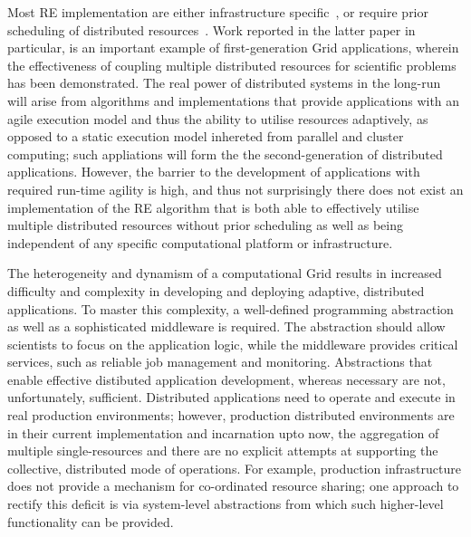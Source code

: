 \documentclass{rspublic}
\begin{document}
Most RE implementation are either infrastructure
specific~\cite{catchup}, or require prior scheduling of distributed
resources~\cite{owain}. Work reported in the latter paper in
particular, is an important example of first-generation Grid
applications, wherein the effectiveness of coupling multiple
distributed resources for scientific problems has been
demonstrated. The real power of distributed systems in the long-run
will arise from algorithms and implementations that provide
applications with an agile execution model and thus the ability to
utilise resources adaptively, as opposed to a static execution model
inhereted from parallel and cluster computing; such appliations will
form the the second-generation of distributed applications.  However,
the barrier to the development of applications with required run-time
agility is high, and thus not surprisingly there does not exist an
implementation of the RE algorithm that is both able to effectively
utilise multiple distributed resources without prior scheduling as
well as being independent of any specific computational platform or
infrastructure.

The heterogeneity and dynamism of a computational Grid results in
increased difficulty and complexity in developing and deploying
adaptive, distributed applications.  To master this complexity, a
well-defined programming abstraction as well as a sophisticated
middleware is required. The abstraction should allow scientists to
focus on the application logic, while the middleware provides critical
services, such as reliable job management and monitoring.
Abstractions that enable effective distibuted application development,
whereas necessary are not, unfortunately, sufficient.  Distributed
applications need to operate and execute in real production
environments; however, production distributed environments are in
their current implementation and incarnation upto now, the aggregation
of multiple single-resources and there are no explicit attempts at
supporting the collective, distributed mode of operations.  For
example, production infrastructure does not provide a mechanism for
co-ordinated resource sharing; one approach to rectify this deficit is
via system-level abstractions from which such higher-level
functionality can be provided.

        
\end{document}
